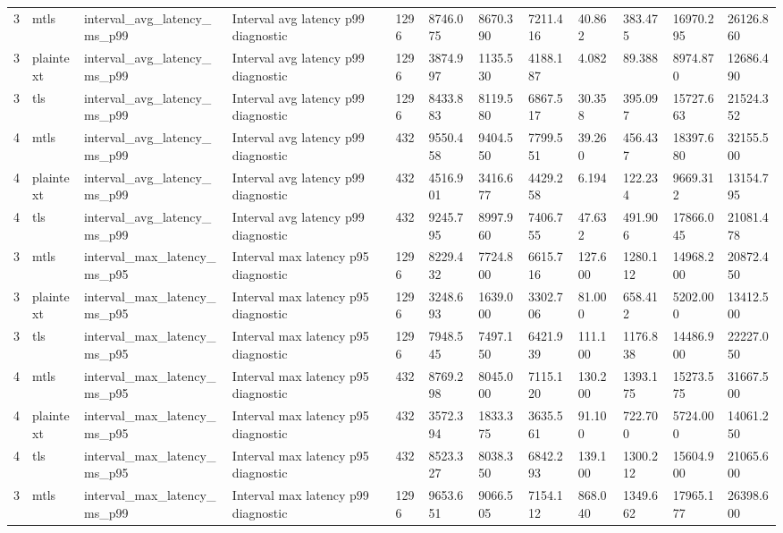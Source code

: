 \begin{longtable}{llllllllllll}
3 & mtls & interval\_avg\_latency\_ms\_p99 & Interval avg latency p99 diagnostic & 1296 & 8746.075 & 8670.390 & 7211.416 & 40.862 & 383.475 & 16970.295 & 26126.860 \\
3 & plaintext & interval\_avg\_latency\_ms\_p99 & Interval avg latency p99 diagnostic & 1296 & 3874.997 & 1135.530 & 4188.187 & 4.082 & 89.388 & 8974.870 & 12686.490 \\
3 & tls & interval\_avg\_latency\_ms\_p99 & Interval avg latency p99 diagnostic & 1296 & 8433.883 & 8119.580 & 6867.517 & 30.358 & 395.097 & 15727.663 & 21524.352 \\
4 & mtls & interval\_avg\_latency\_ms\_p99 & Interval avg latency p99 diagnostic & 432 & 9550.458 & 9404.550 & 7799.551 & 39.260 & 456.437 & 18397.680 & 32155.500 \\
4 & plaintext & interval\_avg\_latency\_ms\_p99 & Interval avg latency p99 diagnostic & 432 & 4516.901 & 3416.677 & 4429.258 & 6.194 & 122.234 & 9669.312 & 13154.795 \\
4 & tls & interval\_avg\_latency\_ms\_p99 & Interval avg latency p99 diagnostic & 432 & 9245.795 & 8997.960 & 7406.755 & 47.632 & 491.906 & 17866.045 & 21081.478 \\
3 & mtls & interval\_max\_latency\_ms\_p95 & Interval max latency p95 diagnostic & 1296 & 8229.432 & 7724.800 & 6615.716 & 127.600 & 1280.112 & 14968.200 & 20872.450 \\
3 & plaintext & interval\_max\_latency\_ms\_p95 & Interval max latency p95 diagnostic & 1296 & 3248.693 & 1639.000 & 3302.706 & 81.000 & 658.412 & 5202.000 & 13412.500 \\
3 & tls & interval\_max\_latency\_ms\_p95 & Interval max latency p95 diagnostic & 1296 & 7948.545 & 7497.150 & 6421.939 & 111.100 & 1176.838 & 14486.900 & 22227.050 \\
4 & mtls & interval\_max\_latency\_ms\_p95 & Interval max latency p95 diagnostic & 432 & 8769.298 & 8045.000 & 7115.120 & 130.200 & 1393.175 & 15273.575 & 31667.500 \\
4 & plaintext & interval\_max\_latency\_ms\_p95 & Interval max latency p95 diagnostic & 432 & 3572.394 & 1833.375 & 3635.561 & 91.100 & 722.700 & 5724.000 & 14061.250 \\
4 & tls & interval\_max\_latency\_ms\_p95 & Interval max latency p95 diagnostic & 432 & 8523.327 & 8038.350 & 6842.293 & 139.100 & 1300.212 & 15604.900 & 21065.600 \\
3 & mtls & interval\_max\_latency\_ms\_p99 & Interval max latency p99 diagnostic & 1296 & 9653.651 & 9066.505 & 7154.112 & 868.040 & 1349.662 & 17965.177 & 26398.600 \\

\end{longtable}
